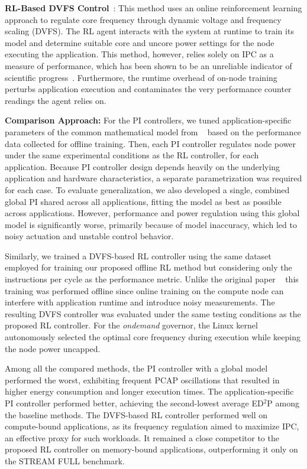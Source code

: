 \textbf{RL-Based DVFS Control}~\cite{10.1145/3716872}: This method uses an online reinforcement learning approach to regulate core frequency through dynamic voltage and frequency scaling (DVFS). The RL agent interacts with the system at runtime to train its model and determine suitable core and uncore power settings for the node executing the application. This method, however, relies solely on IPC as a measure of performance, which has been shown to be an unreliable indicator of scientific progress~\cite{ramesh2019understanding}. Furthermore, the runtime overhead of on-node training perturbs application execution and contaminates the very performance counter readings the agent relies on.

\textbf{Comparison Approach:} For the PI controllers, we tuned application-specific parameters of the common mathematical model from ~\cite{cerf2021sustaining} based on the performance data collected for offline training. Then, each PI controller regulates node power under the same experimental conditions as the RL controller, for each application.
%
Because PI controller design depends heavily on the underlying application and hardware characteristics, a separate parametrization was required for each case. To evaluate generalization, we also developed a single, combined global PI shared across all applications, fitting the model as best as possible across applications. However, performance and power regulation using this global model is significantly worse, primarily because of model inaccuracy, which led to noisy actuation and unstable control behavior.

Similarly, we trained a DVFS-based RL controller using the same dataset employed for training our proposed offline RL method but considering only the instructions per cycle  as the performance metric. Unlike the original paper ~\cite{10.1145/3716872} this training was performed offline since online training on the compute node can interfere with application runtime and introduce noisy measurements. The resulting DVFS controller was evaluated under the same testing conditions as the proposed RL controller. For the \textit{ondemand} governor, the Linux kernel autonomously selected the optimal core frequency during execution while keeping the node power uncapped.

Among all the compared methods, the PI controller with a global model performed the worst, exhibiting frequent PCAP oscillations that resulted in higher energy consumption and longer execution times. The application-specific PI controller performed better, achieving the second-lowest average ED$^2$P among the baseline methods. The DVFS-based RL controller performed well on compute-bound applications, as its frequency regulation aimed to maximize IPC, an effective proxy for such workloads. It remained a close competitor to the proposed RL controller on memory-bound applications, outperforming it only on the STREAM FULL benchmark.

